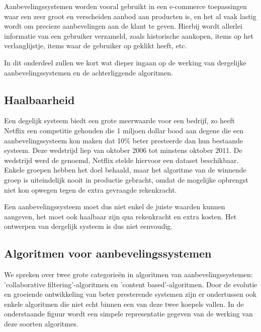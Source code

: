 Aanbevelingssystemen worden vooral gebruikt in een e-commerce toepassingen waar een zeer groot en verscheiden aanbod aan producten is, en het al vaak lastig wordt om precieze aanbevelingen aan de klant te geven. Hierbij wordt allerlei informatie van een gebruiker verzameld, zoals historische aankopen, items op het verlanglijstje, items waar de gebruiker op geklikt heeft, etc.

In dit onderdeel zullen we kort wat dieper ingaan op de werking van dergelijke aanbevelingssystemen en de achterliggende algoritmen.

\subsection{Haalbaarheid}
\label{sec:Haalbaarheid}
Een degelijk systeem biedt een grote meerwaarde voor een bedrijf, zo heeft Netflix  een competitie gehouden die 1 miljoen dollar bood aan degene die een aanbevelingssysteem kon maken dat 10\% beter presteerde dan hun bestaande systeem. Deze wedstrijd liep van oktober 2006 tot minstens oktober 2011. De wedstrijd werd de \cite{NetflixPrize} genoemd, Netflix stelde hiervoor een dataset beschikbaar. Enkele groepen hebben het doel behaald, maar het algoritme van de winnende groep is uiteindelijk nooit in productie gebracht, omdat de mogelijke opbrengst niet kon opwegen tegen de extra gevraagde rekenkracht. 

Een aanbevelingssysteem moet dus niet enkel de juiste waarden kunnen aangeven, het moet ook haalbaar zijn qua rekenkracht en extra kosten. Het ontwerpen van dergelijk systeem is dus niet eenvoudig.

\subsection{Algoritmen voor aanbevelingssystemen}
\label{sec:Algoritmen voor aanbevelingssystemen}

We spreken over twee grote categorieën in algoritmen van aanbevelingssystemen: 'collaborative filtering'-algoritmen en 'content based'-algoritmen.  \cite{Adamovicius2005} Door de evolutie en groeiende ontwikkeling van beter presterende systemen zijn er ondertussen ook enkele algoritmen die niet echt binnen een van deze twee koepels vallen. In de onderstaande figuur wordt een simpele representatie gegeven van de werking van deze soorten algoritmes.

